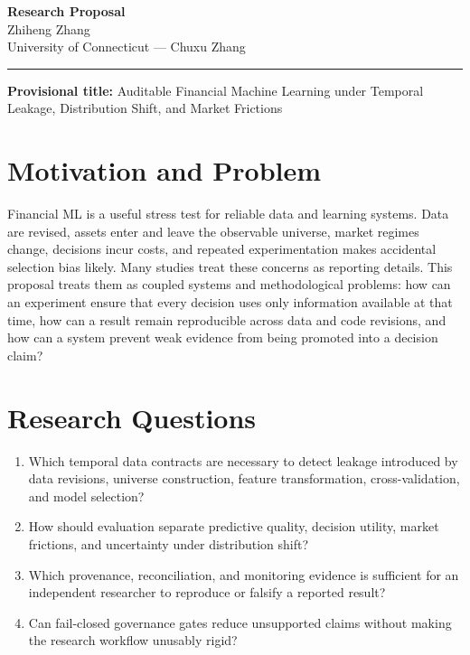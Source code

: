 \documentclass[11pt]{article}
\newcommand{\ApplicantName}{Zhiheng Zhang}
\begin{document}
\begin{center}
{\LARGE\bfseries Research Proposal}\\[0.25em]
{\large \ApplicantName}\\
University of Connecticut --- Chuxu Zhang
\end{center}
\vspace{0.35em}\hrule\vspace{0.65em}

\setlength{\parskip}{0.45em}
\textbf{Provisional title:} Auditable Financial Machine Learning under Temporal Leakage, Distribution Shift, and Market Frictions

\section*{Motivation and Problem}
Financial ML is a useful stress test for reliable data and learning systems. Data are revised, assets enter and leave the observable universe, market regimes change, decisions incur costs, and repeated experimentation makes accidental selection bias likely. Many studies treat these concerns as reporting details. This proposal treats them as coupled systems and methodological problems: how can an experiment ensure that every decision uses only information available at that time, how can a result remain reproducible across data and code revisions, and how can a system prevent weak evidence from being promoted into a decision claim?

\section*{Research Questions}
\begin{enumerate}
\item Which temporal data contracts are necessary to detect leakage introduced by data revisions, universe construction, feature transformation, cross-validation, and model selection?
\item How should evaluation separate predictive quality, decision utility, market frictions, and uncertainty under distribution shift?
\item Which provenance, reconciliation, and monitoring evidence is sufficient for an independent researcher to reproduce or falsify a reported result?
\item Can fail-closed governance gates reduce unsupported claims without making the research workflow unusably rigid?
\end{enumerate}
\end{document}
